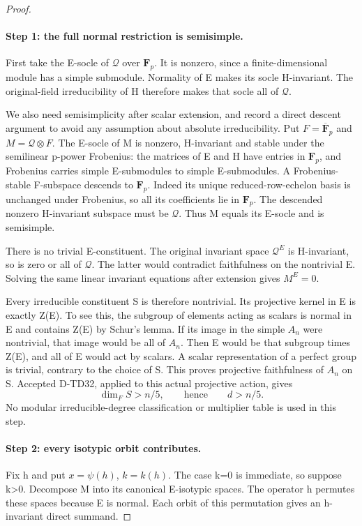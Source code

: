 \begin{proof}
\paragraph{Step 1: the full normal restriction is semisimple.}
First take the E-socle of \(\mathcal Q\) over \(\mathbf F_p\).
It is nonzero, since a finite-dimensional module has a simple
submodule.  Normality of E makes its socle H-invariant.  The
original-field irreducibility of H therefore makes that socle all
of \(\mathcal Q\).

We also need semisimplicity after scalar extension, and record a
direct descent argument to avoid any assumption about absolute
irreducibility.  Put \(F=\overline{\mathbf F}_p\) and
\(M=\mathcal Q\otimes F\).  The E-socle of M is nonzero,
H-invariant and stable under the semilinear p-power Frobenius:
the matrices of E and H have entries in \(\mathbf F_p\), and
Frobenius carries simple E-submodules to simple E-submodules.
A Frobenius-stable F-subspace descends to \(\mathbf F_p\).
Indeed its unique reduced-row-echelon basis is unchanged under
Frobenius, so all its coefficients lie in \(\mathbf F_p\).
The descended nonzero H-invariant subspace must be \(\mathcal Q\).
Thus M equals its E-socle and is semisimple.

There is no trivial E-constituent.  The original invariant space
\(\mathcal Q^E\) is H-invariant, so is zero or all of
\(\mathcal Q\).  The latter would contradict faithfulness on
the nontrivial E.  Solving the same linear invariant equations
after extension gives \(M^E=0\).

Every irreducible constituent S is therefore nontrivial.  Its
projective kernel in E is exactly Z(E).  To see this, the subgroup
of elements acting as scalars is normal in E and contains Z(E)
by Schur's lemma.  If its image in the simple \(A_n\) were
nontrivial, that image would be all of \(A_n\).  Then E would
be that subgroup times Z(E), and all of E would act by scalars.
A scalar representation of a perfect group is trivial, contrary
to the choice of S.  This proves projective faithfulness of
\(A_n\) on S.  Accepted D-TD32, applied to this actual
projective action, gives
\[
             \dim_F S>n/5,\qquad\text{hence}\qquad d>n/5.
 \tag{ANE.5}
\]
No modular irreducible-degree classification or multiplier table
is used in this step.

\paragraph{Step 2: every isotypic orbit contributes.}
Fix h and put \(x=\psi(h)\), \(k=k(h)\).  The case k=0 is
immediate, so suppose k>0.  Decompose M into its canonical
E-isotypic spaces.  The operator h permutes these spaces because
E is normal.  Each orbit of this permutation gives an h-invariant
direct summand.


\end{proof}
